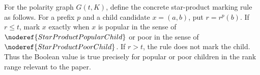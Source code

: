 \begin{definition}
For the polarity graph \(G(t,K)\), define the concrete star-product marking
rule as follows.  For a prefix \(p\) and a child candidate \(x=(a,b)\), put
\(r=r^p(b)\).  If \(r\le t\), mark \(x\) exactly when \(x\) is popular in
the sense of \(\noderef{StarProductPopularChild}\) or poor in the sense of
\(\noderef{StarProductPoorChild}\).  If \(r>t\), the rule does not mark the
child.  Thus the Boolean value is true precisely for popular or poor
children in the rank range relevant to the paper.
\end{definition}
